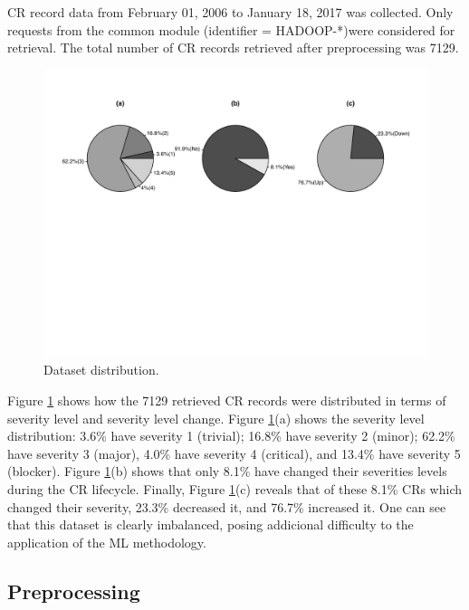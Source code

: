 \documentclass[10pt, conference]{IEEEtran}
\begin{document}
CR record data from February 01, 2006 to January 18, 2017 was collected.  Only requests from the common module (identifier = HADOOP-*)were considered for retrieval. The total number of CR records retrieved after preprocessing was 7129. 

\begin{figure}[!t]
  \includegraphics[scale=0.9]{figures/ds_distribution.pdf}    %
  \caption{Dataset distribution.}
  \label{fig:ds_distribution}
\end{figure}



Figure \ref{fig:ds_distribution} shows how the 7129 retrieved CR records were distributed in terms of severity level and severity level change. Figure \ref{fig:ds_distribution}(a) shows the severity level distribution: 3.6\% have severity 1 (trivial); 16.8\% have severity 2 (minor); 62.2\% have severity 3 (major), 4.0\% have severity 4 (critical), and 13.4\% have severity 5 (blocker). Figure \ref{fig:ds_distribution}(b) shows that only 8.1\% have changed their severities levels during the CR lifecycle. Finally, Figure \ref{fig:ds_distribution}(c) reveals that of these 8.1\% CRs which changed their severity, 23.3\% decreased it, and 76.7\% increased it. One can see that this dataset is clearly imbalanced, posing addicional difficulty to the application of the ML methodology. 

\subsection{Preprocessing} 	\label{subsec:preprocessing}
\end{document}
